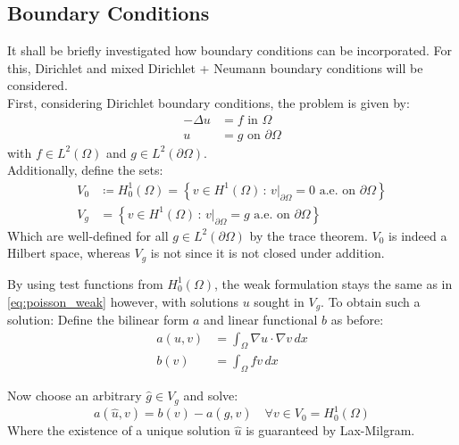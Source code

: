 \documentclass[11pt,a4paper]{article}
\begin{document}
\subsection*{Boundary Conditions}
It shall be briefly investigated how boundary conditions can be incorporated.
For this, Dirichlet and mixed Dirichlet + Neumann boundary conditions will be
considered.\\
First, considering Dirichlet boundary conditions, the problem is given by:
\begin{equation} \label{eq:poisson_dirichlet}
  \begin{split}
    -\Delta u &= f  \text{ in } \Omega\\
    u &= g \text{ on } \partial\Omega
  \end{split}
\end{equation}
with $f \in L^2(\Omega)$ and $g \in L^2(\partial\Omega)$.\\
Additionally, define the sets:
\begin{equation*}
  \begin{split}
    V_0 &\coloneqq H^1_0(\Omega) = \left\{ v \in H^1(\Omega)\, :\, v\vert_{\partial\Omega} = 0 \text{ a.e. on } \partial\Omega\right\}\\
    V_g &= \left\{ v \in H^1(\Omega)\, :\, v\vert_{\partial\Omega} = g \text{ a.e. on } \partial\Omega\right\}
  \end{split}
\end{equation*}
Which are well-defined for all $g \in L^2(\partial\Omega)$ by the trace
theorem. $V_0$ is indeed a Hilbert space, whereas $V_g$ is not since it is
not closed under addition.

By using test functions from $H^1_0(\Omega)$, the weak formulation stays the
same as in \ref{eq:poisson_weak} however, with solutions $u$ sought in $V_g$.
To obtain such a solution: Define the bilinear form $a$ and linear
functional $b$ as before:
\begin{equation*}
  \begin{split}
    a(u,v) &= \int_\Omega \nabla u \cdot \nabla v \,dx\\
    b(v)   &= \int_\Omega fv\,dx
  \end{split}
\end{equation*}

Now choose an arbitrary $\hat{g}\in V_g$ and solve:
\begin{equation*}
  a(\hat{u},v) = b(v) - a(\hat{g},v) \quad \forall v \in V_0 = H^1_0(\Omega)
\end{equation*}
Where the existence of a unique solution $\hat{u}$ is guaranteed by Lax-Milgram.
\end{document}
